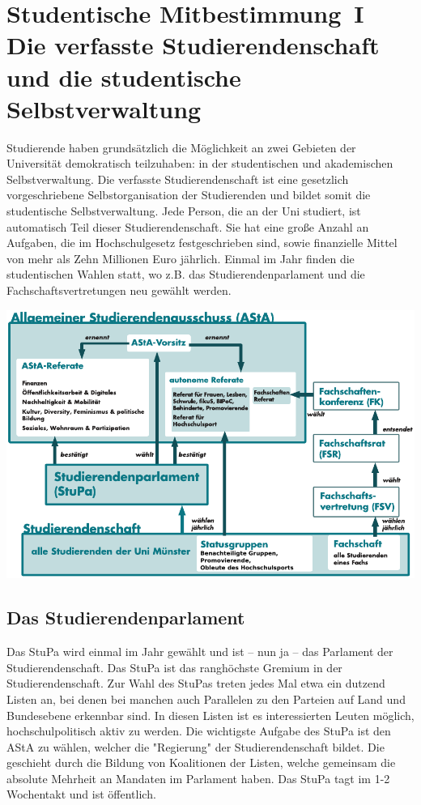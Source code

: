 \section[Studentische Mitbestimmung]{Studentische Mitbestimmung~I\\Die verfasste Studierendenschaft und die studentische Selbstverwaltung}
\label{studmit}
\begin{multicols*}{2}
Studierende haben grundsätzlich die Möglichkeit an zwei Gebieten der Universität demokratisch teilzuhaben: in der studentischen und akademischen Selbstverwaltung.
Die verfasste Studierendenschaft ist eine gesetzlich vorgeschriebene Selbstorganisation der Studierenden und bildet somit die studentische Selbstverwaltung. Jede Person, die an der Uni studiert, ist automatisch Teil dieser Studierendenschaft. Sie hat eine große Anzahl an Aufgaben, die im Hochschulgesetz festgeschrieben sind, sowie finanzielle Mittel von mehr als Zehn Millionen Euro jährlich. 
Einmal im Jahr finden die studentischen Wahlen statt, wo z.B. das Studierendenparlament und die Fachschaftsvertretungen neu gewählt werden. 



\bigskip
\includegraphics[width=\columnwidth]{res/verfasste_studierendenschaft_neu.pdf}
\bigskip


\subsection{Das Studierendenparlament}
Das StuPa wird einmal im Jahr gewählt und ist -- nun ja -- das Parlament der Studierendenschaft. Das StuPa ist das ranghöchste Gremium in der Studierendenschaft. Zur Wahl des StuPas treten jedes Mal etwa ein dutzend Listen an, bei denen bei manchen auch Parallelen zu den Parteien auf Land und Bundesebene erkennbar sind. In diesen Listen ist es interessierten Leuten möglich, hochschulpolitisch aktiv zu werden. 
Die wichtigste Aufgabe des StuPa ist den AStA zu wählen, welcher die "Regierung" der Studierendenschaft bildet. Die geschieht durch die Bildung von Koalitionen der Listen, welche gemeinsam die absolute Mehrheit an Mandaten im Parlament haben. Das StuPa tagt im 1-2 Wochentakt und ist öffentlich. 



\end{multicols*}

